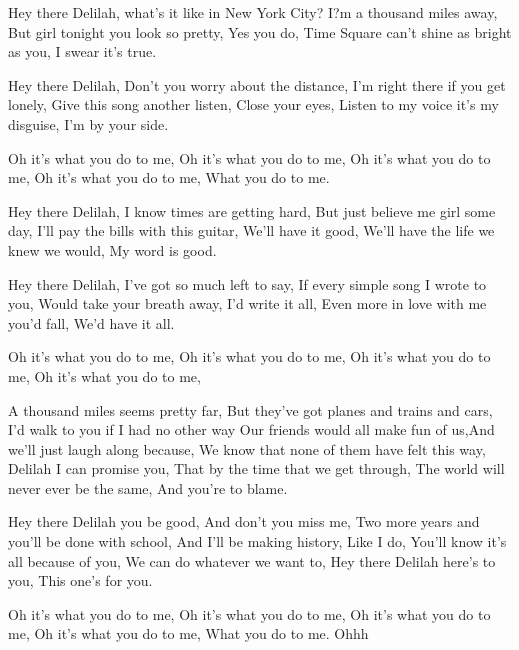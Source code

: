 \resetVars%
%
%
%
%
\makeheader%
\lyrics%

 Hey there Delilah, what's it like in New York City? 
I?m a thousand miles away, But girl tonight you look so pretty, 
Yes you do, Time Square can't shine as bright as you, 
I swear it's true. 

Hey there Delilah, Don't you worry about the distance, 
I'm right there if you get lonely, Give this song another listen, 
Close your eyes, Listen to my voice it's my disguise, 
I'm by your side. 

Oh it's what you do to me, Oh it's what you do to me, 
Oh it's what you do to me, Oh it's what you do to me, 
What you do to me. 

Hey there Delilah, I know times are getting hard, 
But just believe me girl some day, I'll pay the bills with this guitar, 
We'll have it good, We'll have the life we knew we would, 
My word is good. 

Hey there Delilah, I've got so much left to say, 
If every simple song I wrote to you, Would take your breath away, 
I'd write it all, Even more in love with me you'd fall, 
We'd have it all. 

Oh it's what you do to me, Oh it's what you do to me, 
Oh it's what you do to me, Oh it's what you do to me, 
                                      
\continuechords
{}A thousand miles seems pretty far,  But they've got planes and trains and cars,                                 
I'd walk to you if I had no other way
Our friends would all make fun of us,And we'll just laugh along because, 
We know that none of them have felt this way, 
Delilah I can promise you, That by the time that we get through, 
The world will never ever be the same,  And you're to blame. 

Hey there Delilah you be good, And don't you miss me, 
Two more years and you'll be done with school, And I'll be making history, 
Like I do, You'll know it's all because of you, 
We can do whatever we want to, 
Hey there Delilah here's to you, This one's for you. 

Oh it's what you do to me, Oh it's what you do to me, 
Oh it's what you do to me, Oh it's what you do to me, 
What you do to me. 
Ohhh 

\next
